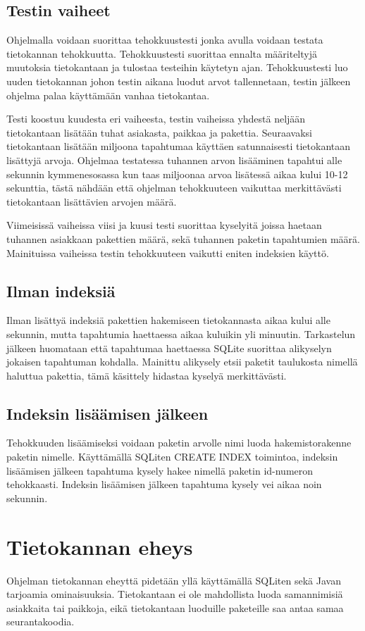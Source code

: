 \documentclass[11pt,a4paper]{article}
\begin{document}
\subsection{Testin vaiheet}
Ohjelmalla voidaan suorittaa tehokkuustesti jonka avulla voidaan testata tietokannan tehokkuutta. Tehokkuustesti suorittaa ennalta määriteltyjä muutoksia tietokantaan ja tulostaa testeihin käytetyn ajan. Tehokkuustesti luo uuden tietokannan johon testin aikana luodut arvot tallennetaan, testin jälkeen ohjelma palaa käyttämään vanhaa tietokantaa.

Testi koostuu kuudesta eri vaiheesta, testin vaiheissa yhdestä neljään tietokantaan lisätään tuhat asiakasta, paikkaa ja pakettia. Seuraavaksi tietokantaan lisätään miljoona tapahtumaa käyttäen satunnaisesti tietokantaan lisättyjä arvoja. Ohjelmaa testatessa tuhannen arvon lisääminen tapahtui alle sekunnin kymmenesosassa kun taas miljoonaa arvoa lisätessä aikaa kului 10-12 sekunttia, tästä nähdään että ohjelman tehokkuuteen vaikuttaa merkittävästi tietokantaan lisättävien arvojen määrä.

Viimeisissä vaiheissa viisi ja kuusi testi suorittaa kyselyitä joissa haetaan tuhannen asiakkaan pakettien määrä, sekä tuhannen paketin tapahtumien määrä. Mainituissa vaiheissa testin tehokkuuteen vaikutti eniten indeksien käyttö.

\subsection{Ilman indeksiä}
Ilman lisättyä indeksiä pakettien hakemiseen tietokannasta aikaa kului alle sekunnin, mutta tapahtumia haettaessa aikaa kuluikin yli minuutin. Tarkastelun jälkeen huomataan että tapahtumaa haettaessa SQLite suorittaa alikyselyn jokaisen tapahtuman kohdalla. Mainittu alikysely etsii paketit taulukosta nimellä haluttua pakettia, tämä käsittely hidastaa kyselyä merkittävästi.

\subsection{Indeksin lisäämisen jälkeen}
Tehokkuuden lisäämiseksi voidaan paketin arvolle nimi luoda hakemistorakenne paketin nimelle. Käyttämällä SQLiten CREATE INDEX toimintoa, indeksin lisäämisen jälkeen tapahtuma kysely hakee nimellä paketin id-numeron tehokkaasti. Indeksin lisäämisen jälkeen tapahtuma kysely vei aikaa noin sekunnin.

\newpage
\section{Tietokannan eheys}
Ohjelman tietokannan eheyttä pidetään yllä käyttämällä SQLiten sekä Javan tarjoamia ominaisuuksia. Tietokantaan ei ole mahdollista luoda samannimisiä asiakkaita tai paikkoja, eikä tietokantaan luoduille paketeille saa antaa samaa seurantakoodia.
\end{document}
